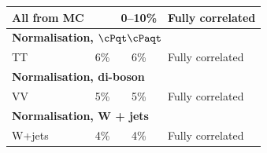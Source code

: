 \begin{table}[!h]
\begin{center}
{\begin{tabular}{l|cc|p{3cm}}
    All from MC      &     & 0--10\% & Fully correlated                    \\
    \hline
    \multicolumn{4}{l}{\textbf{Normalisation, }$\cPqt\cPaqt$}\\
    TT        & 6\%       & 6\% & Fully correlated                        \\
    \hline
    \multicolumn{4}{l}{\textbf{Normalisation, di-boson}} \\
    VV        & 5\%       & 5\% & Fully correlated                       \\
    \hline
    \multicolumn{4}{l}{\textbf{Normalisation, W + jets }}\\
    W+jets & 4\% & 4\% & Fully correlated\\
\end{tabular}}
\label{tab:SystematicUncertainties_zmm}
\end{center}
\end{table}

